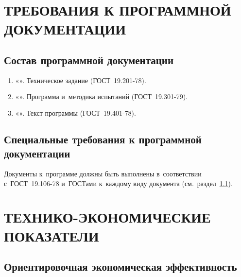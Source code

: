 \documentclass[12pt,a4paper]{extarticle}
\begin{document}
\clearpage

\section{ТРЕБОВАНИЯ К ПРОГРАММНОЙ ДОКУМЕНТАЦИИ}

\subsection{Состав программной документации}
\label{sec:doc_composition}

\begin{enumerate}[label=\arabic*), leftmargin=1.25cm]
\item «\projectname». Техническое задание (ГОСТ~19.201-78).
\item «\projectname». Программа и~методика испытаний (ГОСТ~19.301-79).
\item «\projectname». Текст программы (ГОСТ~19.401-78).
\hseManualDocItems
\end{enumerate}

\subsection{Специальные требования к программной документации}
\label{sec:doc_reqs}

Документы к~программе должны быть выполнены в~соответствии с~ГОСТ~19.106-78 и~ГОСТами к~каждому виду документа (см.~раздел~\ref{sec:doc_composition}).

\clearpage

\section{ТЕХНИКО-ЭКОНОМИЧЕСКИЕ ПОКАЗАТЕЛИ}

\subsection{Ориентировочная экономическая эффективность}
\end{document}
